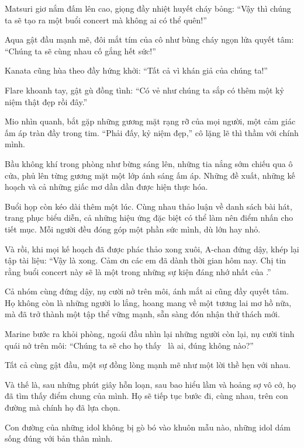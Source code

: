 \documentclass[../main.tex]{subfiles}
\begin{document}
Matsuri giơ nắm đấm lên cao, giọng đầy nhiệt huyết cháy bỏng: ``Vậy thì chúng ta sẽ tạo ra một buổi concert mà không ai có thể quên!''

Aqua gật đầu mạnh mẽ, đôi mắt tím của cô như bùng cháy ngọn lửa quyết tâm: ``Chúng ta sẽ cùng nhau cố gắng hết sức!''

Kanata cũng hùa theo đầy hứng khởi: ``Tất cả vì khán giả của chúng ta!''

Flare khoanh tay, gật gù đồng tình: ``Có vẻ như chúng ta sắp có thêm một kỷ niệm thật đẹp rồi đây.''

Mio nhìn quanh, bắt gặp những gương mặt rạng rỡ của mọi người, một cảm giác ấm áp tràn đầy trong tim. ``Phải đấy, kỷ niệm đẹp,'' cô lặng lẽ thì thầm với chính mình.

Bầu không khí trong phòng như bừng sáng lên, những tia nắng sớm chiếu qua ô cửa, phủ lên từng gương mặt một lớp ánh sáng ấm áp. Những đề xuất, những kế hoạch và cả những giấc mơ dần dần được hiện thực hóa.

Buổi họp còn kéo dài thêm một lúc. Cùng nhau thảo luận về danh sách bài hát, trang phục biểu diễn, cả những hiệu ứng đặc biệt có thể làm nên điểm nhấn cho tiết mục. Mỗi người đều đóng góp một phần sức mình, dù lớn hay nhỏ.

Và rồi, khi mọi kế hoạch đã được phác thảo xong xuôi, A-chan đứng dậy, khép lại tập tài liệu: ``Vậy là xong. Cảm ơn các em đã dành thời gian hôm nay. Chị tin rằng buổi concert này sẽ là một trong những sự kiện đáng nhớ nhất của \hll.''

Cả nhóm cùng đứng dậy, nụ cười nở trên môi, ánh mắt ai cũng đầy quyết tâm. Họ không còn là những người lo lắng, hoang mang về một tương lai mơ hồ nữa, mà đã trở thành một tập thể vững mạnh, sẵn sàng đón nhận thử thách mới.

Marine bước ra khỏi phòng, ngoái đầu nhìn lại những người còn lại, nụ cười tinh quái nở trên môi: ``Chúng ta sẽ cho họ thấy \hll\ là ai, đúng không nào?''

Tất cả cùng gật đầu, một sự đồng lòng mạnh mẽ như một lời thề hẹn với nhau.

Và thế là, sau những phút giây hỗn loạn, sau bao hiểu lầm và hoảng sợ vô cớ, họ đã tìm thấy điểm chung của mình. Họ sẽ tiếp tục bước đi, cùng nhau, trên con đường mà chính họ đã lựa chọn.

Con đường của những idol không bị gò bó vào khuôn mẫu nào, những idol dám sống đúng với bản thân mình.

\omk
\end{document}
